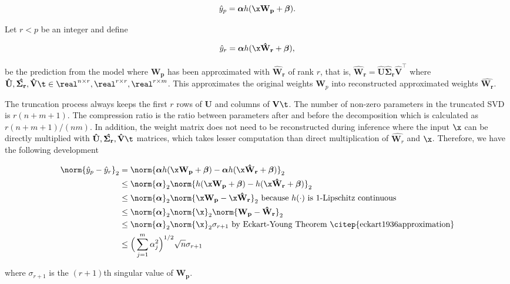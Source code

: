 $$\hat y_p = \boldsymbol{\alpha} h(\x \mathbf{W_p} + \boldsymbol{\beta}).$$ 


Let $r < p$ be an integer and define 

$$\hat y_r = \boldsymbol{\alpha} h(\x \mathbf{\hat W_r} + \boldsymbol{\beta}),$$

be the prediction from the model where $\mathbf{W_p}$ has been approximated with $\mathbf{\hat W_r}$ of rank $r$, that is, $\mathbf{\hat W_r} = \mathbf{\hat U \hat \Sigma_r \hat V^{\top}}$ where $\mathbf{\hat{U}, \hat{\Sigma_r}, \hat{V}\t} \in \real^{n\times r}, \real^{r\times r}, \real^{r \times m}$. This approximates the original weights $\mathbf W_p$ into reconstructed approximated weights $\mathbf{\hat{W_r}}$. 

The truncation process always keeps the first $r$ rows of $\mathbf U$ and columns of $\mathbf V\t$. The number of non-zero parameters in the truncated SVD is $r( n + m + 1)$. The compression ratio is the ratio between parameters after and before the decomposition which is calculated as $r( n + m + 1)/( nm )$. In addition, the weight matrix does not need to be reconstructed during inference where the input $\x$ can be directly multiplied with $\mathbf{\hat{U}, \hat{\Sigma_r}, \hat{V}\t}$ matrices, which takes lesser computation than direct multiplication of $\hat{\mathbf W_r}$ and $\x$. Therefore, we have the following development

\begin{align*}
\norm{ \hat y_p - \hat y_r }_2 &= \norm{\boldsymbol{\alpha} h(\x \mathbf{W_p} + \boldsymbol{\beta}) - \boldsymbol{\alpha} h(\x \mathbf{\hat W_r} + \boldsymbol{\beta})}_2  \\
&\leq \norm{\boldsymbol{\alpha}}_2 \norm{h(\x \mathbf{W_p} + \boldsymbol{\beta}) - h(\x \mathbf{\hat W_r} + \boldsymbol{\beta})}_2\\
&\leq \norm{\boldsymbol{\alpha}}_2 \norm{\x \mathbf{W_p} - \x \mathbf{\hat W_r}}_2 ~ \text{because $h(\cdot)$ is $1$-Lipschitz continuous}\\
&\leq \norm{\boldsymbol{\alpha}}_2 \norm{\x}_2 \norm{\mathbf{W_p} - \mathbf{\hat W_r}}_2\\
&\leq \norm{\boldsymbol{\alpha}}_2 \norm{\x}_2 \sigma_{r+1} ~ \text{by Eckart-Young Theorem \citep{eckart1936approximation}}\\
&\leq \Big( \sum_{j=1}^m \alpha_j ^ 2 \Big)^{1/2}  \sqrt{n} \sigma_{r+1}
\end{align*}

where $\sigma_{r+1}$ is the $(r+1)$th singular value of $\mathbf{W_p}$.






